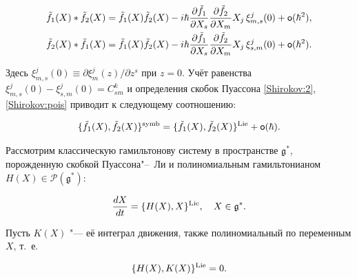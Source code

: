 \begin{eqnarray*}

&{\tilde f}_1(X)*{\tilde f}_2(X)={\tilde f}_1(X){\tilde f}_2(X)-i\hbar\frac{\partial {\tilde f}_1}{\partial X_s}\frac{\partial {\tilde f}_2}{\partial X_m}X_j\,\xi^j_{m,s}(0)+{\sf o}(\hbar^2),\\

&{\tilde f}_2(X)*{\tilde f}_1(X)={\tilde f}_1(X){\tilde f}_2(X)-i\hbar\frac{\partial {\tilde f}_1}{\partial X_s}\frac{\partial {\tilde f}_2}{\partial X_m}X_j\,\xi^j_{s,m}(0)+{\sf o}(\hbar^2).

\end{eqnarray*}

Здесь $\xi^j_{m,s}(0)\equiv \partial \xi^j_m(z)/\partial z^s$ при $z=0$. Учёт равенства $\xi^j_{m,s}(0)-\xi^j_{s,m}(0)=C_{sm}^k$ и определения скобок Пуассона \eqref{Shirokov:2}, \eqref{Shirokov:pois} приводит к следующему соотношению:

\begin{equation}

\label{Shirokov:21}

 \{{\tilde f}_1(X),{\tilde f}_2(X)\}^{\rm symb}=\{{\tilde f}_1(X),{\tilde f}_2(X)\}^{\rm Lie}+{\sf o}(\hbar).

\end{equation}



\smallskip



\label{p5}

Рассмотрим классическую гамильтонову систему в пространстве $ \mathfrak{g}^\ast $, порожденную скобкой Пуассона"--~Ли и полиномиальным гамильтонианом $ H(X)\in \mathcal{P}(\mathfrak{g}^\ast)$:

\begin{equation}

\label{Shirokov:20}

\frac{d X}{d t}=\{H(X),X\}^{\rm Lie},\quad X\in \mathfrak{g}^\ast.

\end{equation}

Пусть $ K(X) $ "--- её интеграл движения, также полиномиальный по переменным $ X $, т.~е. 

\begin{equation}\label{HK}

\{H(X),K(X)\}^{\rm Lie}=0.

\end{equation}

